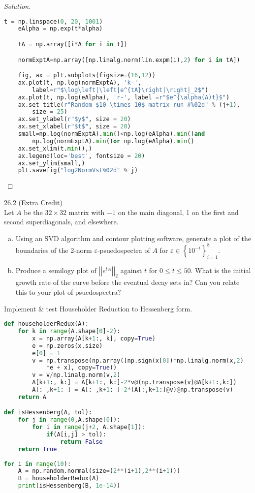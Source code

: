 \documentclass{article}
\newcommand{\be}{\begin{enumerate}}
\newcommand{\ee}{\end{enumerate}}
\newcommand{\gnorm}[1]{\left|\left|#1\right|\right|}
\newcommand{\bracks}[1]{\left\{#1\right\}}
\newcommand{\vep}{\varepsilon}
\begin{document}
\begin{proof}[Solution]
\begin{lstlisting}[language=python]
	t = np.linspace(0, 20, 1001)
	eAlpha = np.exp(t*alpha)

	tA = np.array([i*A for i in t])

	normExptA=np.array([np.linalg.norm(lin.expm(i),2) for i in tA])

	fig, ax = plt.subplots(figsize=(16,12))
	ax.plot(t, np.log(normExptA), 'k-', 
		label=r"$\log\left|\left|e^{tA}\right|\right|_2$")
	ax.plot(t, np.log(eAlpha), 'r-', label =r"$e^{\alpha(A)t}$")
	ax.set_title(r"Random $10 \times 10$ matrix run #%02d" % (j+1),
		size = 25)
	ax.set_ylabel(r"$y$", size = 20)
	ax.set_xlabel(r"$t$", size = 20)
	small=np.log(normExptA).min()<np.log(eAlpha).min()and 
		np.log(normExptA).min()or np.log(eAlpha).min()
	ax.set_xlim(t.min(),)
	ax.legend(loc='best', fontsize = 20)
	ax.set_ylim(small,)
	plt.savefig("log2NormVst%02d" % j)
	\end{lstlisting}
	\end{proof}
	
	
	\item 26.2 (Extra Credit)\\
	Let $A$ be the $32\times 32$ matrix with $-1$ on the main diagonal, 1 on the first and second superdiagonals, and elsewhere.
	\be[(a)]
		\item Using an SVD algorithm and contour plotting software, generate a plot of the boundaries of the 2-norm $\vep$-psuedospectra of $A$ for $\vep \in \bracks{10^{-i}}_{i=1}^8$.
		
		\item Produce a semilogy plot of $\gnorm{e^{tA}}_2$ against $t $ for $0 \leq t \leq 50$. What is the initial growth rate of the curve before the eventual decay sets in? Can you relate this to your plot of psuedospectra?
		
	\ee  
	
	\item Implement \& test Householder Reduction to Hessenberg form.
	\begin{lstlisting}[language=python]
def householderRedux(A):
	for k in range(A.shape[0]-2):
		x = np.array(A[k+1:, k], copy=True)
		e = np.zeros(x.size)
		e[0] = 1
		v = np.transpose(np.array([np.sign(x[0])*np.linalg.norm(x,2)
			*e + x], copy=True))
		v = v/np.linalg.norm(v,2)
		A[k+1:, k:] = A[k+1:, k:]-2*v@(np.transpose(v)@A[k+1:,k:])
		A[: ,k+1: ] = A[: ,k+1: ]-2*(A[:,k+1:]@v)@np.transpose(v)
	return A

def isHessenberg(A, tol):
	for j in range(0,A.shape[0]):
		for i in range(j+2, A.shape[1]):
			if(A[i,j] > tol):
				return False
	return True
	
for i in range(10):
	A = np.random.normal(size=(2**(i+1),2**(i+1)))
	B = householderRedux(A)
	print(isHessenberg(B, 1e-14))
	\end{lstlisting}
	
\end{document}
